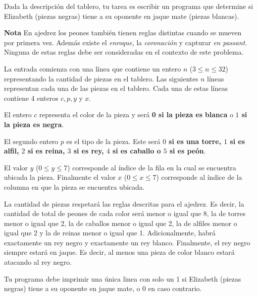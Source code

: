\documentclass{oci}
\begin{document}
\begin{problemDescription}
\begin{center}
\scalebox{1}{\chessboard[setfen=7K/6q1/6k1/8/8/8/8/8]}
\end{center}

Dada la descripción del tablero, tu tarea es escribir un programa que determine si Elizabeth
(piezas negras) tiene a su oponente en jaque mate (piezas blancas).

{\bf Nota}\hspace{0.5em} En ajedrez los peones también tienen reglas distintas cuando se mueven
por primera vez.
Además existe el \emph{enroque}, la \emph{coronación} y
capturar \emph{en passant}.
Ninguna de estas reglas debe ser consideradas en el contexto de este problema.

\end{problemDescription}

\begin{inputDescription}
La entrada comienza con una línea que contiene un entero $n$ ($ 3 \leq n
    \leq 32$) representando la cantidad de piezas en el tablero.
Las siguientes $n$ líneas representan cada una de las piezas en el tablero.
Cada una de estas líneas contiene 4 enteros $c, p, y$ y $x$.

El entero $c$ representa el color de la pieza y será {\bf 0 si la pieza es blanca} o
{\bf $1$ si la pieza es negra}.

El segundo entero $p$ es el tipo de la pieza.
Este será {\bf $0$ si es una torre, $1$ si es alfil, $2$ si es reina, $3$ si es rey, $4$
si es caballo o $5$ si es peón}.

El valor $y$ ($0\leq y \leq 7$) corresponde al índice de la fila en la cual se encuentra
ubicada la pieza.
Finalmente el valor $x$ ($0\leq x \leq 7$) corresponde al índice de la columna en que
la pieza se encuentra ubicada.

La cantidad de piezas respetará las reglas descritas para el ajedrez.
Es decir, la cantidad de total de peones de cada color será menor o igual que 8, la de torres
menor o igual que 2, la de caballos menor o igual que 2, la de alfiles menor o igual que 2 y la
de reinas menor o igual que 1.
Adicionalmente, habrá exactamente un rey negro y exactamente un rey blanco.
Finalmente, el rey negro siempre estará en jaque.
Es decir, al menos una pieza de color blanco estará atacando al rey negro.
\end{inputDescription}

\begin{outputDescription}
Tu programa debe imprimir una única linea con solo un 1 si
Elizabeth (piezas negras) tiene a su oponente en jaque mate, o 0 en caso contrario.
\end{outputDescription}
\end{document}
